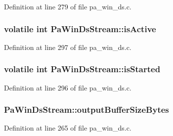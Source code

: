 Definition at line 279 of file pa\+\_\+win\+\_\+ds.\+c.

\subsubsection[{\texorpdfstring{is\+Active}{isActive}}]{\setlength{\rightskip}{0pt plus 5cm}volatile {\bf int} Pa\+Win\+Ds\+Stream\+::is\+Active}\hypertarget{struct_pa_win_ds_stream_ab04552e705c27b479607fa0466245659}{}\label{struct_pa_win_ds_stream_ab04552e705c27b479607fa0466245659}


Definition at line 297 of file pa\+\_\+win\+\_\+ds.\+c.

\subsubsection[{\texorpdfstring{is\+Started}{isStarted}}]{\setlength{\rightskip}{0pt plus 5cm}volatile {\bf int} Pa\+Win\+Ds\+Stream\+::is\+Started}\hypertarget{struct_pa_win_ds_stream_a5a472759667878d811378f2be06a781d}{}\label{struct_pa_win_ds_stream_a5a472759667878d811378f2be06a781d}


Definition at line 296 of file pa\+\_\+win\+\_\+ds.\+c.

\subsubsection[{\texorpdfstring{output\+Buffer\+Size\+Bytes}{outputBufferSizeBytes}}]{ Pa\+Win\+Ds\+Stream\+::output\+Buffer\+Size\+Bytes}\hypertarget{struct_pa_win_ds_stream_ae737c04ba94374539a74220fe52931f7}{}\label{struct_pa_win_ds_stream_ae737c04ba94374539a74220fe52931f7}


Definition at line 265 of file pa\+\_\+win\+\_\+ds.\+c.

